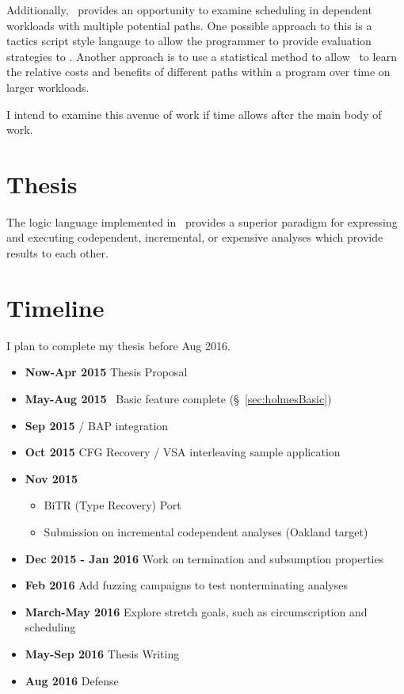 Additionally, \sysname\ provides an opportunity to examine scheduling in dependent workloads with multiple potential paths.
One possible approach to this is a tactics script style langauge to allow the programmer to provide evaluation strategies to \sysname.
Another approach is to use a statistical method to allow \sysname\ to learn the relative costs and benefits of different paths within a program over time on larger workloads.

I intend to examine this avenue of work if time allows after the main body of work.
\section{Thesis}
The logic language implemented in \sysname\ provides a superior paradigm for expressing and executing codependent, incremental, or expensive analyses which provide results to each other.
\section{Timeline}
I plan to complete my thesis before Aug 2016.
\begin{itemize}[label={}]
\item {\bf Now-Apr 2015} Thesis Proposal
\item {\bf May-Aug 2015} \sysname\ Basic feature complete (\S~\ref{sec:holmesBasic})
\item {\bf Sep 2015} \sysname / BAP integration
\item {\bf Oct 2015} CFG Recovery / VSA interleaving sample application
\item {\bf Nov 2015}
  \begin{itemize}
  \item BiTR (Type Recovery) Port
  \item Submission on incremental codependent analyses (Oakland target)
  \end{itemize}
\item {\bf Dec 2015 - Jan 2016} Work on termination and subsumption properties
\item {\bf Feb 2016} Add fuzzing campaigns to test nonterminating analyses
\item {\bf March-May 2016} Explore stretch goals, such as circumscription and scheduling 
\item {\bf May-Sep 2016} Thesis Writing
\item {\bf Aug 2016} Defense
\end{itemize}
